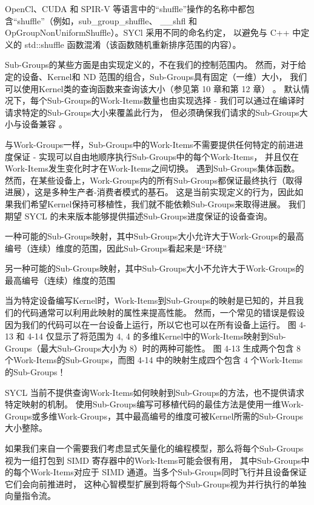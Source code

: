 \begin{remark}
	OpenCl、CUDA 和 SPIR-V 等语言中的“shuffle”操作的名称中都包含“shuffle”（例如，sub\_group\_shuffle、
	\_\_shfl 和 OpGroupNonUniformShuffle）。SYCl 采用不同的命名约定，
	以避免与 C++ 中定义的 std::shuffle 函数混淆（该函数随机重新排序范围的内容）。
\end{remark}

Sub-Groups的某些方面是由实现定义的，不在我们的控制范围内。 
然而，对于给定的设备、Kernel和 ND 范围的组合，Sub-Groups具有固定（一维）大小，
我们可以使用Kernel类的查询函数来查询该大小（参见第 10 章和第 12 章） 。 
默认情况下，每个Sub-Groups的Work-Items数量也由实现选择 - 我们可以通过在编译时请求特定的Sub-Groups大小来覆盖此行为，
但必须确保我们请求的Sub-Groups大小与设备兼容 。

与Work-Groups一样，Sub-Groups中的Work-Items不需要提供任何特定的前进进度保证 - 实现可以自由地顺序执行Sub-Groups中的每个Work-Items，
并且仅在Work-Items发生变化时才在Work-Items之间切换。 遇到Sub-Groups集体函数。 
然而，在某些设备上，Work-Groups内的所有Sub-Groups都保证最终执行（取得进展），这是多种生产者-消费者模式的基石。 
这是当前实现定义的行为，因此如果我们希望Kernel保持可移植性，我们就不能依赖Sub-Groups来取得进展。 
我们期望 SYCL 的未来版本能够提供描述Sub-Groups进度保证的设备查询。

{\color{red} 一种可能的Sub-Groups映射，其中Sub-Groups大小允许大于Work-Groups的最高编号（连续）维度的范围，因此Sub-Groups看起来是“环绕”}

{\color{red} 另一种可能的Sub-Groups映射，其中Sub-Groups大小不允许大于Work-Groups的最高编号（连续）维度的范围}

当为特定设备编写Kernel时，Work-Items到Sub-Groups的映射是已知的，并且我们的代码通常可以利用此映射的属性来提高性能。 
然而，一个常见的错误是假设因为我们的代码可以在一台设备上运行，所以它也可以在所有设备上运行。 
图 4-13 和 4-14 仅显示了将范围为 {4, 4} 的多维Kernel中的Work-Items映射到Sub-Groups（最大Sub-Groups大小为 8）时的两种可能性。 
图 4-13 生成两个包含 8 个Work-Items的Sub-Groups，而图 4-14 中的映射生成四个包含 4 个Work-Items的Sub-Groups！

SYCL 当前不提供查询Work-Items如何映射到Sub-Groups的方法，也不提供请求特定映射的机制。 
使用Sub-Groups编写可移植代码的最佳方法是使用一维Work-Groups或多维Work-Groups，其中最高编号的维度可被Kernel所需的Sub-Groups大小整除。

\begin{remark}
	如果我们来自一个需要我们考虑显式矢量化的编程模型，那么将每个Sub-Groups视为一组打包到 SIMD 寄存器中的Work-Items可能会很有用，
	其中Sub-Groups中的每个Work-Items对应于 SIMD 通道。当多个Sub-Groups同时飞行并且设备保证它们会向前推进时，
	这种心智模型扩展到将每个Sub-Groups视为并行执行的单独向量指令流。
\end{remark}

